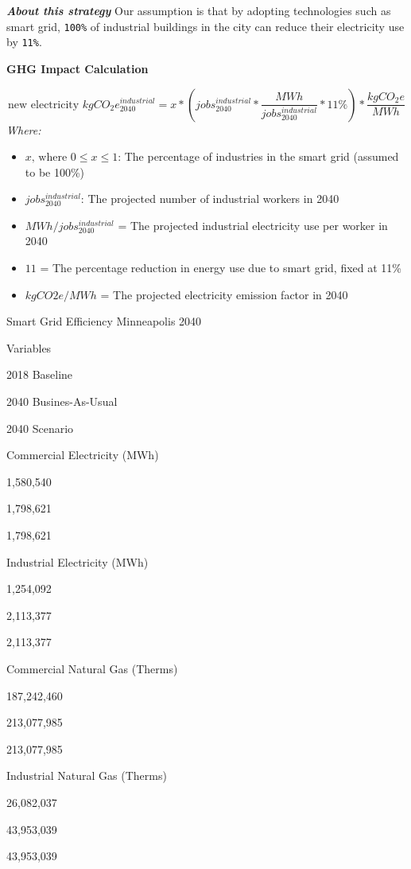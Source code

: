 \documentclass[
]{book}
\providecommand{\tightlist}{%
  \setlength{\itemsep}{0pt}\setlength{\parskip}{0pt}}
\begin{document}
\textbf{\emph{About this strategy}} Our assumption is that by adopting technologies such as smart grid, \texttt{100\%} of industrial buildings in the city can reduce their electricity use by \texttt{11\%}.

\textbf{GHG Impact Calculation}

\[ \text{new electricity } kgCO_2e_{2040}^{industrial} = x * \left(jobs^{industrial}_{2040} * \frac{MWh}{jobs^{industrial}_{2040}} * 11\% \right) * \frac{kgCO_2e}{MWh}\]
\emph{Where:}

\begin{itemize}
\tightlist
\item
  \(x\text{, where } 0 \le x \le 1\): The percentage of industries in the smart grid (assumed to be 100\%)
\item
  \(jobs^{industrial}_{2040}\): The projected number of industrial workers in 2040
\item
  \(MWh/jobs^{industrial}_{2040}\) = The projected industrial electricity use per worker in 2040
\item
  \(11%
  \) = The percentage reduction in energy use due to smart grid, fixed at 11\%
\item
  \(kgCO2e/MWh\) = The projected electricity emission factor in 2040
\end{itemize}

\label{tab:fig03b2}Smart Grid Efficiency Minneapolis 2040

Variables

2018 Baseline

2040 Busines-As-Usual

2040 Scenario

Commercial Electricity (MWh)

1,580,540

1,798,621

1,798,621

Industrial Electricity (MWh)

1,254,092

2,113,377

2,113,377

Commercial Natural Gas (Therms)

187,242,460

213,077,985

213,077,985

Industrial Natural Gas (Therms)

26,082,037

43,953,039

43,953,039
\end{document}
